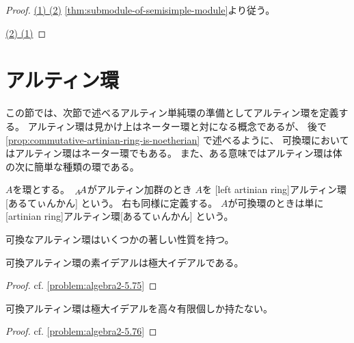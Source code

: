 \documentclass[report]{jlreq}
\begin{document}
\begin{proof}
    \uline{(1) \Rightarrow (2)} \quad
    \cref{thm:submodule-of-semisimple-module}より従う。

    \uline{(2) \Rightarrow (1)} \quad
    \TODO{}
\end{proof}



%
\section{アルティン環}

この節では、次節で述べるアルティン単純環の準備としてアルティン環を定義する。
アルティン環は見かけ上はネーター環と対になる概念であるが、
後で\cref{prop:commutative-artinian-ring-is-noetherian}
で述べるように、
可換環においてはアルティン環はネーター環でもある。
また、ある意味ではアルティン環は体の次に簡単な種類の環である。

\begin{definition}[アルティン環]
    $A$を環とする。
    $\,{}_{A}\!A$がアルティン加群のとき
    $A$を
    [left artinian ring]{アルティン環}[あるてぃんかん]
    という。
    右も同様に定義する。
    $A$が可換環のときは単に
    [artinian ring]{アルティン環}[あるてぃんかん]
    という。
\end{definition}

可換なアルティン環はいくつかの著しい性質を持つ。

\begin{proposition}
    可換アルティン環の素イデアルは極大イデアルである。
\end{proposition}

\begin{proof}
    cf. \cref{problem:algebra2-5.75}
\end{proof}

\begin{proposition}
    可換アルティン環は極大イデアルを高々有限個しか持たない。
\end{proposition}

\begin{proof}
    cf. \cref{problem:algebra2-5.76}
\end{proof}

\end{document}
